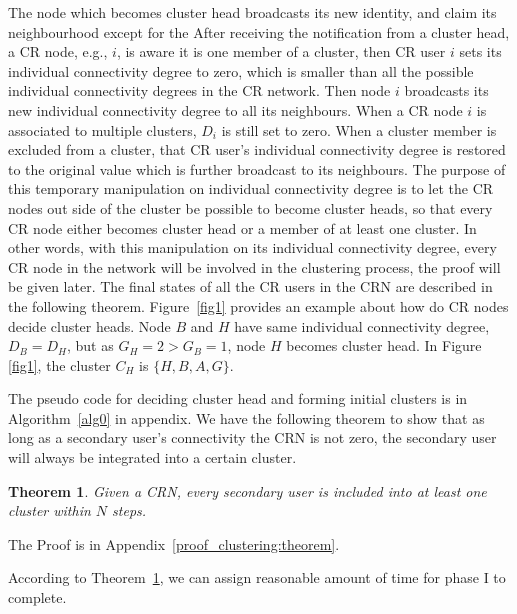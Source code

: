 \documentclass[journal,comsoc]{IEEEtran}
\theoremstyle{mytheoremstyle}
\newtheorem{theorem}{Theorem}[section]
\theoremstyle{mytheoremstyle}
\theoremstyle{mytheoremstyle}
\newcommand{\eg}{e.g., }
\begin{document}
The node which becomes cluster head broadcasts its new identity, and claim its neighbourhood except for the 
After receiving the notification from a cluster head, a CR node, \eg $i$, is aware it is one member of a cluster, then CR user $i$ sets its individual connectivity degree to zero, which is smaller than all the possible individual connectivity degrees in the CR network.
Then node $i$ broadcasts its new individual connectivity degree to all its neighbours. 
When a CR node $i$ is associated to multiple clusters, $D_i$ is still set to zero. %
When a cluster member is excluded from a cluster, that CR user's individual connectivity degree is restored to the original value which is further broadcast to its neighbours.
The purpose of this temporary manipulation on individual connectivity degree is to let the CR nodes out side of the cluster be possible to become cluster heads, so that every CR node either becomes cluster head or a member of at least one cluster.
In other words, with this manipulation on its individual connectivity degree, every CR node in the network will be involved in the clustering process, the proof will be given later.
The final states of all the CR users in the CRN are described in the following theorem.
Figure~\ref{fig1} provides an example about how do CR nodes decide cluster heads.
Node $B$ and $H$ have same individual connectivity degree, $D_B=D_H$, but as $G_H=2>G_B=1$, node $H$ becomes cluster head.
In Figure \ref{fig1}, the cluster $C_H$ is $\{H, B, A, G\}$.

The pseudo code for deciding cluster head and forming initial clusters is in Algorithm~\ref{alg0} in appendix.
We have the following theorem to show that as long as a secondary user's connectivity the CRN is not zero, the secondary user will always be integrated into a certain cluster.


\begin{theorem}
\label{clustering:theorem}
Given a CRN, every secondary user is included into at least one cluster within $N$ steps.
\end{theorem}
The Proof is in Appendix~\ref{proof_clustering:theorem}.

According to Theorem~\ref{clustering:theorem}, we can assign reasonable amount of time for phase I to complete.
\end{document}
